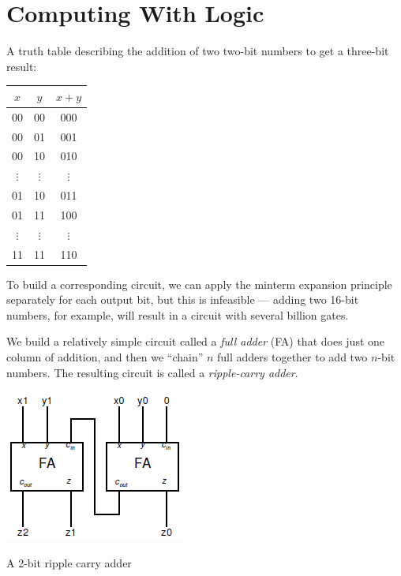 \documentclass[8pt,a4paper,compress,handout]{beamer}
\begin{document}
\section{Computing With Logic}
\begin{frame}[fragile]
A truth table describing the addition of two two-bit numbers to get a three-bit result:
\begin{center}
\begin{tabular}{cc|c}
$x$ & $y$ & $x +y$ \\ \hline
00 & 00 & 000 \\
00 & 01 & 001 \\
00 & 10 & 010 \\
$\vdots$ & $\vdots$ & $\vdots$ \\
01 & 10 & 011 \\
01 & 11 & 100 \\
$\vdots$ & $\vdots$ & $\vdots$ \\
11 & 11 & 110
\end{tabular}
\end{center}
To build a corresponding circuit, we can apply the minterm expansion principle separately for each output bit, but this is infeasible --- adding two 16-bit numbers, for example, will result in a circuit with several billion gates.
\end{frame}

\begin{frame}[fragile]
We build a relatively simple circuit called a \emph{full adder} (FA) that does just one column of addition, and then we ``chain'' $n$ full adders together to add two $n$-bit numbers. The resulting circuit is called a \emph{ripple-carry adder}.
\begin{center}
\includegraphics[scale=0.4]{figures/ripple_carry_adder.png}

\smallskip

\tiny A 2-bit ripple carry adder
\end{center}
\end{frame}
\end{document}
